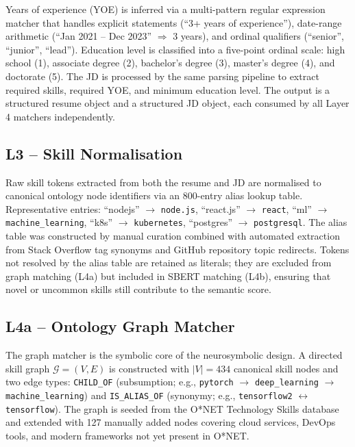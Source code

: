 \documentclass[conference]{IEEEtran}
\begin{document}
Years of experience (YOE) is inferred via a multi-pattern regular expression
matcher that handles explicit statements (``3+ years of experience''),
date-range arithmetic (``Jan 2021 -- Dec 2023'' $\Rightarrow$ 3 years), and
ordinal qualifiers (``senior'', ``junior'', ``lead''). Education level is
classified into a five-point ordinal scale: high school (1), associate
degree (2), bachelor's degree (3), master's degree (4), and doctorate (5).
The JD is processed by the same parsing pipeline to extract required skills,
required YOE, and minimum education level. The output is a structured
resume object and a structured JD object, each consumed by all Layer 4
matchers independently.

\subsection{L3 -- Skill Normalisation}
Raw skill tokens extracted from both the resume and JD are normalised to
canonical ontology node identifiers via an 800-entry alias lookup table.
Representative entries: ``nodejs'' $\rightarrow$ \texttt{node.js},
``react.js'' $\rightarrow$ \texttt{react}, ``ml'' $\rightarrow$
\texttt{machine\_learning}, ``k8s'' $\rightarrow$ \texttt{kubernetes},
``postgres'' $\rightarrow$ \texttt{postgresql}. The alias table was
constructed by manual curation combined with automated extraction from
Stack Overflow tag synonyms and GitHub repository topic redirects.
Tokens not resolved by the alias table are retained as literals; they
are excluded from graph matching (L4a) but included in SBERT matching (L4b),
ensuring that novel or uncommon skills still contribute to the semantic score.

\subsection{L4a -- Ontology Graph Matcher}
The graph matcher is the symbolic core of the neurosymbolic design.
A directed skill graph $\mathcal{G} = (V, E)$ is constructed with
$|V| = 434$ canonical skill nodes and two edge types:
\texttt{CHILD\_OF} (subsumption; e.g., \texttt{pytorch} $\rightarrow$
\texttt{deep\_learning} $\rightarrow$ \texttt{machine\_learning}) and
\texttt{IS\_ALIAS\_OF} (synonymy; e.g., \texttt{tensorflow2}
$\leftrightarrow$ \texttt{tensorflow}). The graph is seeded from the O*NET
Technology Skills database and extended with 127 manually added nodes
covering cloud services, DevOps tools, and modern frameworks not yet present
in O*NET.
\end{document}
